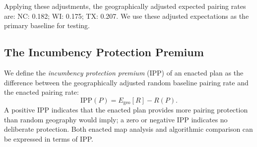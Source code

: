 Applying these adjustments, the geographically adjusted expected pairing rates are:
NC: 0.182; WI: 0.175; TX: 0.207. We use these adjusted expectations as the primary
baseline for testing.

\subsection{The Incumbency Protection Premium}

We define the \textit{incumbency protection premium} (IPP) of an enacted plan as the
difference between the geographically adjusted random baseline pairing rate and the
enacted pairing rate:
\[
  \text{IPP}(P) = E_{\text{geo}}[R] - R(P).
\]
A positive IPP indicates that the enacted plan provides more pairing protection than
random geography would imply; a zero or negative IPP indicates no deliberate protection.
Both enacted map analysis and algorithmic comparison can be expressed in terms of IPP.
